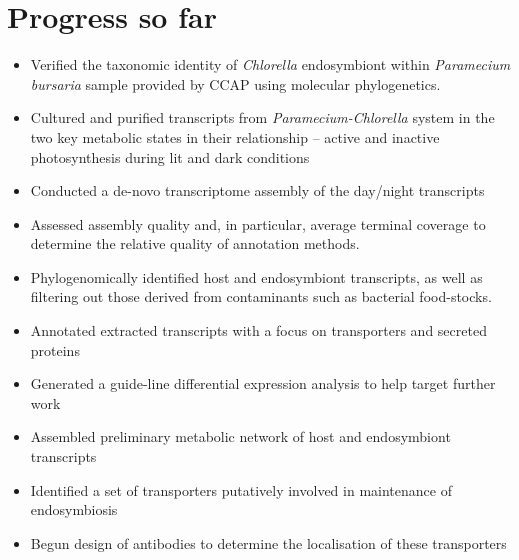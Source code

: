 \section{Progress so far}
\begin{itemize}
  \item Verified the taxonomic identity of \textit{Chlorella} endosymbiont within \textit{Paramecium bursaria} sample provided by CCAP using molecular phylogenetics.
  \item Cultured and purified transcripts from \textit{Paramecium-Chlorella} system in the two key metabolic states in their relationship – active and inactive photosynthesis during lit and dark conditions
  \item Conducted a de-novo transcriptome assembly of the day/night transcripts
  \item Assessed assembly quality and, in particular, average terminal coverage to determine the relative quality of annotation methods.
  \item Phylogenomically identified host and endosymbiont transcripts, as well as filtering out those derived from contaminants such as bacterial food-stocks.
  \item Annotated extracted transcripts with a focus on transporters and secreted proteins
  \item Generated a guide-line differential expression analysis to help target further work
  \item Assembled preliminary metabolic network of host and endosymbiont transcripts
  \item Identified a set of transporters putatively involved in maintenance of endosymbiosis
  \item Begun design of antibodies to determine the localisation of these transporters
\end{itemize}


